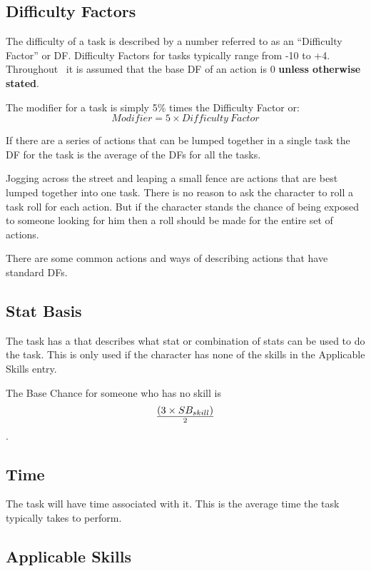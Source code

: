 \subsection{Difficulty Factors}

The difficulty of a task is described by a number 
referred to as an ``Difficulty Factor'' or DF. Difficulty Factors 
for tasks typically range from -10  to +4. Throughout \SH\ it is 
assumed that the base DF of an action is 0 {\bf unless otherwise 
stated}. 

The modifier for a task is simply 5\% times the Difficulty Factor or:
\[ Modifier = 5 \times {Difficulty\ Factor} \]

If there are a series of actions that can be lumped 
together in a single task the DF for the task is the average of the DFs for all the tasks.

Jogging across the street and leaping a small fence are actions that 
are best lumped together into one task. There is no reason 
to ask the character to roll a task roll for each action. 
But if the character stands the chance of being exposed to
someone looking for him then a roll should be made for the entire set 
of actions. 

There are some common actions and ways of describing actions that have
standard DFs.




\subsection{Stat Basis}

The task has a  that describes what stat or combination of 
stats can be used to do the task. This is only used if the character 
has none of the skills in the Applicable Skills entry. 

The Base Chance for someone who has no skill is 
\[ (3 \times SB_{skill}) \over {2} \]. 

\subsection{Time}

The task will have time associated with it. This is the average time 
the task typically takes to perform. 

\subsection{Applicable Skills}


